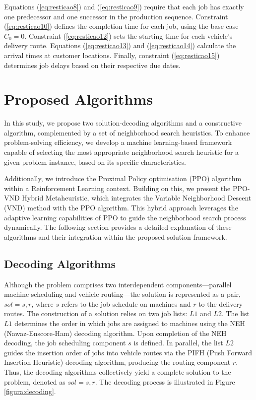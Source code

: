 \documentclass{article}
\begin{document}
Equations (\ref{eq:resticao8}) and (\ref{eq:resticao9}) require that each job has exactly one predecessor and one successor in the production sequence. Constraint (\ref{eq:resticao10}) defines the completion time for each job, using the base case $C_0 = 0$. Constraint (\ref{eq:resticao12}) sets the starting time for each vehicle's delivery route. Equations (\ref{eq:resticao13}) and (\ref{eq:resticao14}) calculate the arrival times at customer locations. Finally, constraint (\ref{eq:resticao15}) determines job delays based on their respective due dates.


\section{Proposed Algorithms}
\label{sec:algorithm}
In this study, we propose two solution-decoding algorithms and a constructive algorithm, complemented by a set of neighborhood search heuristics. To enhance problem-solving efficiency, we develop a machine learning-based framework capable of selecting the most appropriate neighborhood search heuristic for a given problem instance, based on its specific characteristics.

Additionally, we introduce the Proximal Policy optimisation (PPO) algorithm within a Reinforcement Learning context. Building on this, we present the PPO-VND Hybrid Metaheuristic, which integrates the Variable Neighborhood Descent (VND) method with the PPO algorithm. This hybrid approach leverages the adaptive learning capabilities of PPO to guide the neighborhood search process dynamically. The following section provides a detailed explanation of these algorithms and their integration within the proposed solution framework.


\subsection{Decoding Algorithms}

Although the problem comprises two interdependent components—parallel machine scheduling and vehicle routing—the solution is represented as a pair, $sol = {s, r}$, where $s$ refers to the job schedule on machines and $r$ to the delivery routes. The construction of a solution relies on two job lists: $L1$ and $L2$. The list $L1$ determines the order in which jobs are assigned to machines using the NEH (Nawaz-Enscore-Ham) decoding algorithm. Upon completion of the NEH decoding, the job scheduling component $s$ is defined. In parallel, the list $L2$ guides the insertion order of jobs into vehicle routes via the PIFH (Push Forward Insertion Heuristic) decoding algorithm, producing the routing component $r$. Thus, the decoding algorithms collectively yield a complete solution to the problem, denoted as $sol = {s, r}$. The decoding process is illustrated in Figure \ref{figura:decoding}.
\end{document}

